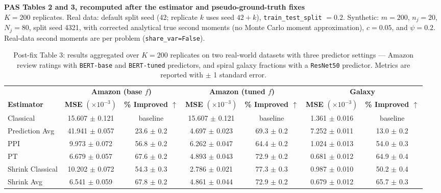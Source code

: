 \documentclass[11pt]{article}
\begin{document}
\begin{center}
{\large\bfseries PAS Tables 2 and 3, recomputed after the estimator and pseudo-ground-truth fixes}\\[3pt]
{\small $K = 200$ replicates. Real data: default split seed (42; replicate $k$ uses seed $42+k$), \texttt{train\_test\_split} $=0.2$.
Synthetic: $m = 200$, $n_j = 20$, $N_j = 80$, split seed 4321, with corrected
analytical true second moments (no Monte Carlo moment approximation), $c=0.05$,
and $\psi=0.2$.
Real-data second moments are per problem (\texttt{share\_var=False}).}
\end{center}

\begin{table}[H]
    \centering
    \caption{Post-fix Table 3: results aggregated over $K = 200$ replicates on two real-world datasets with three predictor settings --- Amazon review ratings with \texttt{BERT-base} and \texttt{BERT-tuned} predictors, and spiral galaxy fractions with a \texttt{ResNet50} predictor. Metrics are reported with $\pm$ 1 standard error.}
    \label{tbl:postfix_real}
    \vskip 0.05in
    \footnotesize
    \begin{tabular}{lcccccc}
    \toprule
    & \multicolumn{2}{c}{\textbf{Amazon (base $f$)}} & \multicolumn{2}{c}{\textbf{Amazon (tuned $f$)}} & \multicolumn{2}{c}{\textbf{Galaxy}} \\
    \cmidrule(lr){2-3} \cmidrule(lr){4-5} \cmidrule(lr){6-7}
    \textbf{Estimator} & \textbf{MSE} \( (\times 10^{-3}) \) & \textbf{\% Improved $\uparrow$} & \textbf{MSE} \( (\times 10^{-3}) \) & \textbf{\% Improved $\uparrow$} & \textbf{MSE} \( (\times 10^{-3}) \) & \textbf{\% Improved $\uparrow$} \\
    \midrule
    Classical & 15.607 $\pm$ 0.121 & baseline & 15.607 $\pm$ 0.121 & baseline & 1.361 $\pm$ 0.016 & baseline \\
    Prediction Avg & 41.941 $\pm$ 0.057 & 23.6 $\pm$ 0.2 & 4.697 $\pm$ 0.023 & 69.3 $\pm$ 0.2 & 7.252 $\pm$ 0.011 & 13.0 $\pm$ 0.2 \\
    PPI & 9.973 $\pm$ 0.072 & 56.8 $\pm$ 0.2 & 6.262 $\pm$ 0.047 & 64.4 $\pm$ 0.2 & 1.024 $\pm$ 0.013 & 54.0 $\pm$ 0.3 \\
    PT & 6.679 $\pm$ 0.057 & 67.6 $\pm$ 0.2 & 4.893 $\pm$ 0.043 & 72.9 $\pm$ 0.2 & 0.681 $\pm$ 0.012 & 64.9 $\pm$ 0.4 \\
    Shrink Classical & 10.202 $\pm$ 0.072 & 54.3 $\pm$ 0.3 & 2.786 $\pm$ 0.021 & 77.3 $\pm$ 0.3 & 0.987 $\pm$ 0.010 & 50.2 $\pm$ 0.4 \\
    Shrink Avg & 6.541 $\pm$ 0.059 & 67.8 $\pm$ 0.2 & 4.861 $\pm$ 0.044 & 72.9 $\pm$ 0.2 & 0.679 $\pm$ 0.012 & 65.7 $\pm$ 0.3 \\

\end{tabular}
\end{table}
\end{document}
